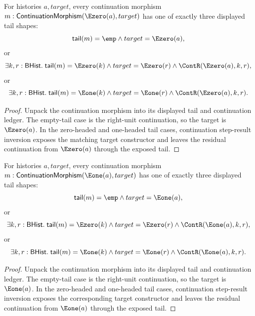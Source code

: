 \begin{theorem}
\label{thm:continuation-morphism-e0-source-tail-cases}
For histories $a,target$, every continuation morphism
$m:\mathsf{ContinuationMorphism}(\Ezero(a),target)$ has one of exactly three
displayed tail shapes:
$$
\mathsf{tail}(m)=\emp\land target=\Ezero(a),
$$
or
$$
\exists k,r:\mathsf{BHist}.\;
\mathsf{tail}(m)=\Ezero(k)\land target=\Ezero(r)\land
\ContR(\Ezero(a),k,r),
$$
or
$$
\exists k,r:\mathsf{BHist}.\;
\mathsf{tail}(m)=\Eone(k)\land target=\Eone(r)\land
\ContR(\Ezero(a),k,r).
$$
\end{theorem}
\begin{proof}
Unpack the continuation morphism into its displayed tail and continuation
ledger. The empty-tail case is the right-unit continuation, so the target is
$\Ezero(a)$. In the zero-headed and one-headed tail cases, continuation
step-result inversion exposes the matching target constructor and leaves the
residual continuation from $\Ezero(a)$ through the exposed tail.
\end{proof}

\begin{theorem}
\label{thm:continuation-morphism-e1-source-tail-cases}
For histories $a,target$, every continuation morphism
$m:\mathsf{ContinuationMorphism}(\Eone(a),target)$ has one of exactly three
displayed tail shapes:
$$
\mathsf{tail}(m)=\emp\land target=\Eone(a),
$$
or
$$
\exists k,r:\mathsf{BHist}.\;
\mathsf{tail}(m)=\Ezero(k)\land target=\Ezero(r)\land
\ContR(\Eone(a),k,r),
$$
or
$$
\exists k,r:\mathsf{BHist}.\;
\mathsf{tail}(m)=\Eone(k)\land target=\Eone(r)\land
\ContR(\Eone(a),k,r).
$$
\end{theorem}
\begin{proof}
Unpack the continuation morphism into its displayed tail and continuation
ledger. The empty-tail case is the right-unit continuation, so the target is
$\Eone(a)$. In the zero-headed and one-headed tail cases, continuation
step-result inversion exposes the corresponding target constructor and leaves
the residual continuation from $\Eone(a)$ through the exposed tail.
\end{proof}

